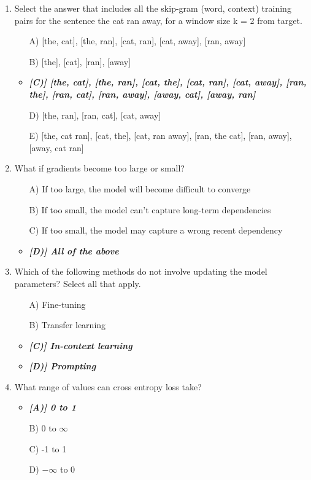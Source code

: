 \documentclass[10pt]{article}
\begin{document}
\begin{enumerate}
    \item Select the answer that includes all the skip-gram (word, context) training pairs for the sentence the cat ran away, for a window size k = 2 from target.
    \begin{itemize}
        \item[A)] [the, cat], [the, ran], [cat, ran], [cat, away], [ran, away]
        \item[B)]  [the], [cat], [ran], [away]
        \item\textit{\textbf{[C)] [the, cat], [the, ran], [cat, the], [cat, ran], [cat, away], [ran, the], [ran, cat], [ran, away], [away, cat], [away, ran]}}
        \item[D)] [the, ran], [ran, cat], [cat, away]
        \item[E)] [the, cat ran], [cat, the], [cat, ran away], [ran, the cat], [ran, away], [away, cat ran]
    \end{itemize}

    \item What if gradients become too large or small?
    \begin{itemize}
        \item[A)] If too large, the model will become difficult to converge 
        \item[B)] If too small, the model can’t capture long-term dependencies 
        \item[C)] If too small, the model may capture a wrong recent dependency 
        \item\textit{\textbf{[D)] All of the above}}
    \end{itemize}

    \item Which of the following methods do not involve updating the model parameters? Select all that apply.
    \begin{itemize}
        \item[A)] Fine-tuning
        \item[B)] Transfer learning
        \item\textit{\textbf{[C)] In-context learning}}
        \item\textit{\textbf{[D)] Prompting}}
    \end{itemize}

    \item What range of values can cross entropy loss take?
    \begin{itemize}
        \item\textit{\textbf{[A)] 0 to 1}}
        \item[B)] 0 to $\infty$
        \item[C)] -1 to 1
        \item[D)] $-\infty$ to 0
    \end{itemize}
    

\end{enumerate}
\end{document}

